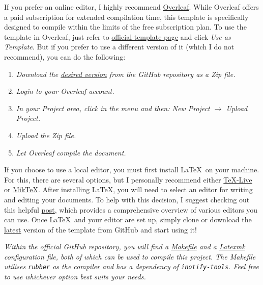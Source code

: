 {If you prefer an online editor, I highly recommend \href{https://www.overleaf.com/}{Overleaf}. While Overleaf offers a paid subscription for extended compilation time, this template is specifically designed to compile within the limits of the free subscription plan. To use the template in Overleaf, just refer to \href{https://www.overleaf.com/latex/templates/unofficial-polytechnic-university-of-leiria-estg-thesis-slash-report-template/tqgbrncfhwgt}{official template page} and click \textit{Use as Template}. But if you prefer to use a different version of it (which I do not recommend), you can do the following:

\begin{enumerate}[font=\itshape]
    \setlength{\itemsep}{.375em}
    \item \textit{Download the \href{https://github.com/joseareia/ipleiria-thesis/releases}{desired version} from the GitHub repository as a Zip file.}
    \item \textit{Login to your Overleaf account.}
    \item \textit{In your Project area, click in the menu and then: New Project \(\to\) Upload Project.}
    \item \textit{Upload the Zip file.}
    \item \textit{Let Overleaf compile the document.}
\end{enumerate}

If you choose to use a local editor, you must first install \LaTeX~on your machine. For this, there are several options, but I personally recommend either \href{https://www.tug.org/texlive/}{TeX-Live} or \href{https://miktex.org/}{MikTeX}. After installing \LaTeX, you will need to select an editor for writing and editing your documents. To help with this decision, I suggest checking out this helpful \href{https://tex.stackexchange.com/questions/339/latex-editors-ides}{post}, which provides a comprehensive overview of various editors you can use. Once \LaTeX~and your editor are set up, simply clone or download the \href{https://github.com/joseareia/ipleiria-thesis/releases}{latest} version of the template from GitHub and start using it!

\begin{block}[tip]
\textit{Within the official GitHub repository, you will find a \href{https://github.com/joseareia/ipleiria-thesis/blob/master/Makefile}{Makefile} and a \href{https://github.com/joseareia/ipleiria-thesis/blob/master/.latexmkrc}{Latexmk} configuration file, both of which can be used to compile this project. The Makefile utilises \texttt{rubber} as the compiler and has a dependency of \texttt{inotify-tools}. Feel free to use whichever option best suits your needs.}
\end{block}

}

